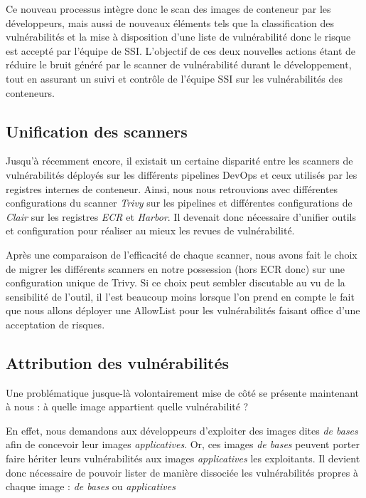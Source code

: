 Ce nouveau processus intègre donc le scan des images de conteneur par les développeurs, mais aussi de nouveaux éléments tels
que la classification des vulnérabilités et la mise à disposition d'une liste de vulnérabilité donc le risque est accepté
par l'équipe de \ac{SSI}.
\newline L'objectif de ces deux nouvelles actions étant de réduire le bruit généré par le scanner de vulnérabilité durant
le développement, tout en assurant un suivi et contrôle de l'équipe \ac{SSI} sur les vulnérabilités des conteneurs.

\newpage

\subsection{Unification des scanners}
Jusqu'à récemment encore, il existait un certaine disparité entre les scanners de vulnérabilités déployés sur les 
différents pipelines DevOps et ceux utilisés par les registres internes de conteneur. Ainsi, nous nous retrouvions avec 
différentes configurations du scanner \emph{Trivy} sur les pipelines et différentes configurations de \emph{Clair} sur les
registres \emph{\ac{ECR}} et \emph{Harbor}. 
\newline Il devenait donc nécessaire d'unifier outils et configuration pour réaliser au mieux les revues de vulnérabilité.

Après une comparaison de l'efficacité de chaque scanner, nous avons fait le choix de migrer les différents scanners en 
notre possession (hors \ac{ECR} donc) sur une configuration unique de Trivy. Si ce choix peut sembler discutable au vu 
de la sensibilité de l'outil, il l'est beaucoup moins lorsque l'on prend en compte le fait que nous allons déployer une
AllowList pour les vulnérabilités faisant office d'une acceptation de risques.

\subsection{Attribution des vulnérabilités}
Une problématique jusque-là volontairement mise de côté se présente maintenant à nous : à quelle image appartient quelle 
vulnérabilité ?

En effet, nous demandons aux développeurs d'exploiter des images dites \emph{de bases} afin de concevoir leur 
images \emph{applicatives}. Or, ces images \emph{de bases} peuvent porter faire hériter leurs vulnérabilités aux images 
\emph{applicatives} les exploitants.
\newline Il devient donc nécessaire de pouvoir lister de manière dissociée les vulnérabilités propres à chaque image : 
\emph{de bases} ou \emph{applicatives}

